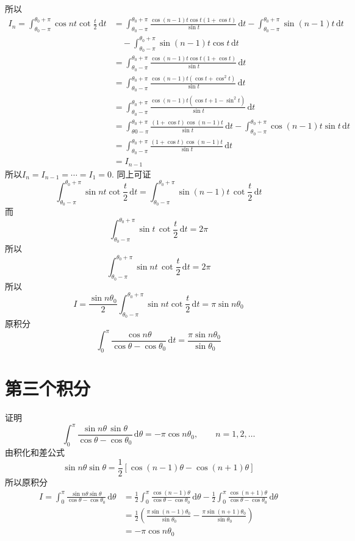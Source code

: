所以
\begin{align*}
    I_n=
    \int _{\theta_0-\pi}^{\theta_0+\pi} \cos nt \cot \frac{t}{2} \,\mathrm{d} t 
    &=\int _{\theta_0-\pi}^{\theta_0+\pi} \frac{\cos (n-1)t \cos t (1+\cos t)}{\sin t}\,\mathrm{d}t
    -
    \int _{\theta_0-\pi}^{\theta_0+\pi} \sin (n-1)t \,\mathrm{d}t \\ 
    & \quad
    -
    \int _{\theta_0-\pi}^{\theta_0+\pi} \sin (n-1)t \cos t \,\mathrm{d}t\\ 
    &=\int _{\theta_0-\pi}^{\theta_0+\pi} \frac{\cos (n-1)t \cos t (1+\cos t)}{\sin t} \,\mathrm{d} t\\ 
    &=\int _{\theta_0-\pi}^{\theta_0+\pi} \frac{\cos (n-1)t (\cos t +\cos ^2 t)}{\sin t} \,\mathrm{d}t\\ 
    &=\int _{\theta_0-\pi}^{\theta_0+\pi} \frac{\cos (n-1)t (\cos t +1- \sin ^2 t )}{\sin t}\,\mathrm{d}t \\ 
    &=\int _{\theta0-\pi}^{\theta_0+\pi} \frac{(1+\cos t)\cos (n-1)t }{\sin t}\,\mathrm{d}t
    -\int _{\theta_0-\pi}^{\theta_0+\pi} \cos (n-1)t \sin t \,\mathrm{d}t \\ 
    &=\int _{\theta_0-\pi}^{\theta_0+\pi} \frac{(1+\cos t)\cos (n-1)t }{\sin t}\,\mathrm{d}t \\ 
    &=I_{n-1}
\end{align*}
所以$I_n=I_{n-1}=\cdots =I_1=0$.
同上可证
\[
  \int _{\theta_0-\pi}^{\theta_0+\pi} \sin nt \cot \frac{t}{2} \,\mathrm{d}t =
  \int _{\theta_0-\pi}^{\theta_0+\pi} \sin (n-1)t \, \cot \frac{t}{2}\,\mathrm{d}t
\]
而
\[
  \int _{\theta_0-\pi}^{\theta_0+\pi} \sin t \, \cot \frac{t}{2} \,\mathrm{d} t =2\pi
\]
所以
\[
  \int _{\theta_0-\pi}^{\theta_0+\pi} \sin nt \, \cot \frac{t}{2}\,\mathrm{d} t =2\pi
\]
所以
\[
  I=\frac{\sin n \theta_0}{2} \int _{\theta_0-\pi}^{\theta_0+\pi} \sin nt \cot \frac{t}{2}\, \mathrm{d} t 
  =\pi \sin n \theta_0
\]
原积分
\[
  \int _0^{\pi} \frac{\cos n \theta}{\cos \theta -\cos \theta_0}\,\mathrm{d}t =
  \frac{\pi \sin n \theta_0}{\sin \theta_0}
\]

\section{第三个积分}
{
  \color{titleblue}
  证明
  \[
    \int _0^\pi \frac{\sin n \theta\,\sin \theta}{\cos \theta - \cos \theta_0}\,
    \mathrm{d} \theta=-\pi \cos n \theta_0,\qquad n=1,2, \ldots 
  \]
}
由积化和差公式
\[
  \sin n \theta \sin \theta =\frac{1}{2}\left[\cos (n-1)\theta -\cos (n+1)\theta\right]
\]
所以原积分
\[
  \begin{split}
    I=\int _0^\pi \frac{\sin n \theta \sin \theta}{\cos \theta -\cos \theta_0}\,\mathrm{d}\theta
    &=\frac{1}{2} \int _0^\pi \frac{\cos (n-1) \theta}{\cos \theta-\cos \theta_0}\,\mathrm{d}\theta
    -\frac{1}{2}\int _0^\pi \frac{\cos (n+1) \theta}{\cos \theta -\cos \theta_0}\, \mathrm{d} \theta\\ 
    &=\frac{1}{2} \left(\frac{\pi \sin (n-1)\theta_0}{\sin \theta_0}-\frac{\pi \sin (n+1)\theta_0}{\sin \theta_0}\right)\\ 
    &=-\pi \cos n \theta_0
  \end{split}
\]
